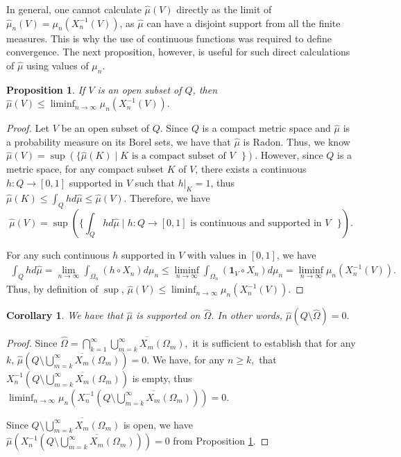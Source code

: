 \documentclass{amsart}
\newtheorem{prop}[thm]{Proposition}
\newtheorem{cor}[thm]{Corollary}
\theoremstyle{definition}
\theoremstyle{remark}
\def \HOM{\hat{\Omega}}
\def \HMU{\hat{\mu}}
\begin{document}
In general, one cannot calculate $\HMU(V)$ directly as the limit of $\HMU_n(V)=\mu_n(X_n^{-1}(V))$, as $\HMU$ can have a disjoint support from all the finite measures. This is why the use of continuous functions was required to define convergence. The next proposition, however, is useful for such direct calculations of $\HMU$ using values of $\mu_n$.
\begin{prop}\label{proposition_open_measure}
	If $V$ is an open subset of $Q$, then $\HMU(V)\leq \liminf_{n\rightarrow\infty} \mu_n(X_n^{-1}(V)).$
\end{prop}
\begin{proof}
	Let $V$ be an open subset of $Q$. Since $Q$ is a compact metric space and $\HMU$ is a probability measure on its Borel sets, we have that $\HMU$ is Radon. Thus, we know $\HMU(V)=\sup(\{\HMU(K)\;|\; K \text{ is a compact subset of $V$ } \}).$ However, since $Q$ is a metric space, for any compact subset $K$ of $V$, there exists a continuous $h:Q\rightarrow [0,1]$ supported in $V$ such that $h|_K =1$, thus $\HMU(K)\leq \int_{Q} h d\HMU \leq \HMU(V).$ Therefore, we have $$\HMU(V)=\sup(\{\int_{Q}hd\HMU\;|\; h:Q\rightarrow[0,1] \text{ is continuous and supported in $V$ } \}).$$
	
	For any such continuous $h$ supported in $V$ with values in $[0,1]$, we have 
	\begin{align*}
		\int_{Q}hd\HMU=\lim_{n\rightarrow\infty}\int_{\Omega_n}(h\circ X_n)d\mu_n\leq\liminf_{n\rightarrow\infty}\int_{\Omega_n}(\mathbf{1}_V\circ X_n)d\mu_n=\liminf_{n\rightarrow\infty} \mu_n(X_n^{-1}(V)).
	\end{align*}
	Thus, by definition of $\sup$, $\HMU(V)\leq\liminf_{n\rightarrow\infty} \mu_n(X_n^{-1}(V)).$
\end{proof}
\begin{cor}\label{corollary_suport_limits}
	We have that $\HMU$ is supported on $\HOM$. In other words, $\HMU(Q\setminus\HOM)=0.$
\end{cor}
\begin{proof}
	Since $\HOM=\bigcap_{k=1}^\infty\overline{\bigcup_{m=k}^{\infty}X_m(\Omega_m)},$ it is sufficient to establish that for any $k$, $\HMU(Q\setminus\overline{\bigcup_{m=k}^{\infty}X_m(\Omega_m)})=0.$ We have, for any $n\geq k,$ that $X_n^{-1}\left(Q\setminus\overline{\bigcup_{m=k}^{\infty}X_m(\Omega_m)}\right)$ is empty, thus $\liminf_{n\rightarrow\infty} \mu_n\left(X_n^{-1}\left(Q\setminus\overline{\bigcup_{m=k}^{\infty}X_m(\Omega_m)}\right)\right)=0.$  
	
	Since $Q\setminus\overline{\bigcup_{m=k}^{\infty}X_m(\Omega_m)}$ is open, we have $\HMU\left(X_n^{-1}\left(Q\setminus\overline{\bigcup_{m=k}^{\infty}X_m(\Omega_m)}\right)\right)=0$ from Proposition \ref{proposition_open_measure}.
\end{proof}
\end{document}
